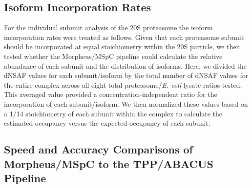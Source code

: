 \subsection {Isoform Incorporation Rates}
\label{subsec:isoform}
	For the individual subunit analysis of the 20S proteasome the isoform incorporation rates were treated as follows. Given that each proteasome subunit should be incorporated at equal stoichiometry within the 20S particle, we then tested whether the Morpheus/MSpC pipeline could calculate the relative abundance of each subunit and the distribution of isoforms.  Here, we divided the dNSAF values for each subunit/isoform by the total number of dNSAF values for the entire complex across all eight total proteasome/\textit{E. coli} lysate ratios tested.  This averaged value provided a concentration-independent ratio for the incorporation of each subunit/isoform.  We then normalized these values based on a 1/14 stoichiometry of each subunit within the complex to calculate the estimated occupancy versus the expected occupancy of each subunit.  

\subsection{Speed and Accuracy Comparisons of Morpheus/MSpC to the TPP/ABACUS Pipeline}

